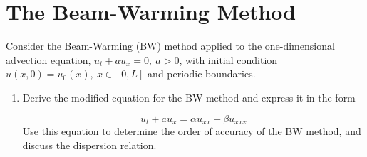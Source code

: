 \pagebreak
\section{The Beam-Warming Method}
Consider the Beam-Warming (BW) method applied to the one-dimensional advection equation, $u_t + au_x= 0,\ a >0$, with initial condition $u(x,0) =u_0(x),\ x \in [0,L]$ and periodic boundaries.

\begin{enumerate}[label=\alph*., start = 1]
    \item Derive the modified equation for the BW method and express it in the form
    
    \vspace{-0.2in}
    \begin{equation*}
        u_t + au_x = \alpha u_{xx} - \beta u_{xxx}
    \end{equation*}
    Use this equation to determine the order of accuracy of the BW method, and discuss the dispersion relation.


\end{enumerate}
